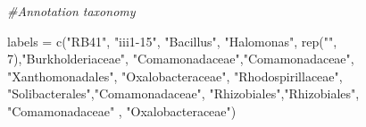 \documentclass[]{interact}
\theoremstyle{plain}%
\theoremstyle{definition}
\theoremstyle{remark}
\newenvironment{Shaded}{\begin{snugshade}}{\end{snugshade}}
\newcommand{\CommentTok}[1]{\textcolor[rgb]{0.56,0.35,0.01}{\textit{#1}}}
\newcommand{\DecValTok}[1]{\textcolor[rgb]{0.00,0.00,0.81}{#1}}
\newcommand{\FunctionTok}[1]{\textcolor[rgb]{0.00,0.00,0.00}{#1}}
\newcommand{\NormalTok}[1]{#1}
\newcommand{\OtherTok}[1]{\textcolor[rgb]{0.56,0.35,0.01}{#1}}
\newcommand{\StringTok}[1]{\textcolor[rgb]{0.31,0.60,0.02}{#1}}
\begin{document}
\begin{Shaded}
\begin{Highlighting}[]
\CommentTok{\#Annotation taxonomy}


\NormalTok{labels }\OtherTok{=} \FunctionTok{c}\NormalTok{(}\StringTok{"RB41"}\NormalTok{, }\StringTok{"iii1{-}15"}\NormalTok{, }\StringTok{"Bacillus"}\NormalTok{, }\StringTok{"Halomonas"}\NormalTok{, }\FunctionTok{rep}\NormalTok{(}\StringTok{""}\NormalTok{, }\DecValTok{7}\NormalTok{),}\StringTok{"Burkholderiaceae"}\NormalTok{,}
           \StringTok{"Comamonadaceae"}\NormalTok{,}\StringTok{"Comamonadaceae"}\NormalTok{, }\StringTok{"Xanthomonadales"}\NormalTok{, }\StringTok{"Oxalobacteraceae"}\NormalTok{,}
           \StringTok{"Rhodospirillaceae"}\NormalTok{, }\StringTok{"Solibacterales"}\NormalTok{,}\StringTok{"Comamonadaceae"}\NormalTok{, }\StringTok{"Rhizobiales"}\NormalTok{,}\StringTok{"Rhizobiales"}\NormalTok{,}
           \StringTok{"Comamonadaceae"}\NormalTok{ , }\StringTok{"Oxalobacteraceae"}\NormalTok{)}


\end{Highlighting}
\end{Shaded}
\end{document}
